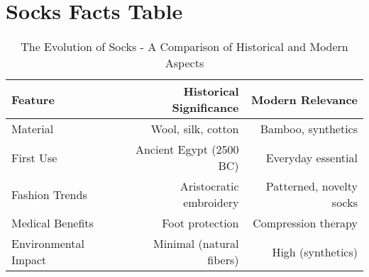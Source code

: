 \documentclass[runningheads]{llncs}
\begin{document}
\section{Socks Facts Table}\label{sec:Socks_Facts_Table}



\begin{table}
\centering
\caption{The Evolution of Socks - A Comparison of Historical and Modern Aspects}
\begin{tabular}{lrr}
\toprule
Feature & Historical Significance & Modern Relevance \\
\midrule
Material & Wool, silk, cotton & Bamboo, synthetics \\
First Use & Ancient Egypt (2500 BC) & Everyday essential \\
Fashion Trends & Aristocratic embroidery & Patterned, novelty socks \\
Medical Benefits & Foot protection & Compression therapy \\
Environmental Impact & Minimal (natural fibers) & High (synthetics) \\
\bottomrule
\end{tabular}
\end{table}
\end{document}
